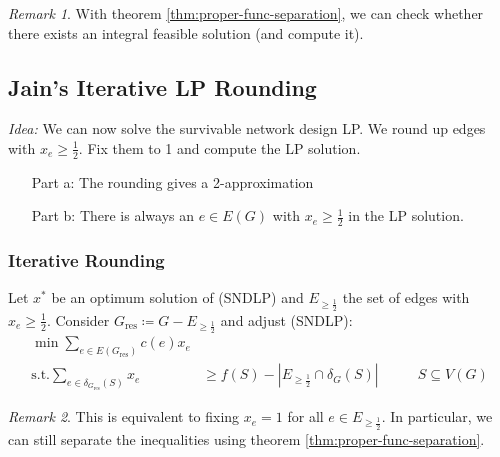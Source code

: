 \documentclass[11pt, a4paper]{article}
\newcommand{\mr}[1]{\mathrm{#1}}
\newcommand{\abs}[1]{\left\lvert#1\right\rvert}
\theoremstyle{remark}
\newtheorem*{uremark}{Remark}
\theoremstyle{definition}
\begin{document}
\begin{uremark}
	With theorem \ref{thm:proper-func-separation}, we can check whether there
	exists an integral feasible solution (and compute it).
\end{uremark}

\subsection{Jain's Iterative LP Rounding}
\emph{Idea:} We can now solve the survivable network design LP. We round
up edges with $x_e\geq\frac{1}{2}$. Fix them to 1 and compute the LP
solution.

\begin{enumerate}
	\item[Part a:] The rounding gives a 2-approximation
	\item[Part b:] There is always an $e\in E(G)$ with $x_e\geq\frac{1}{2}$ in
	the LP solution.
\end{enumerate}

\subsubsection{Iterative Rounding}
Let $x^*$ be an optimum solution of (SNDLP) and $E_{\geq\frac{1}{2}}$
the set of edges with $x_e\geq\frac{1}{2}$. Consider
$G_{\mr{res}}\coloneqq G-E_{\geq\frac{1}{2}}$ and adjust (SNDLP):
\begin{align*}
	\min\sum_{e\in E(G_{\mr{res}})}c(e)x_e                               \\
	\text{s.t.} \sum_{e\in\delta_{G_{\mr{res}}}(S)}x_e & \geq f(S)
	-\abs{E_{\geq\frac{1}{2}}\cap\delta_G(S)} \qquad   & S\subseteq V(G)
\end{align*}
\begin{uremark}
	This is equivalent to fixing $x_e=1$ for all $e\in E_{\geq\frac{1}{2}}$.
	In particular, we can still separate the inequalities using theorem
	\ref{thm:proper-func-separation}.
\end{uremark}
\end{document}

